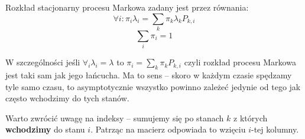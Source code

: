 \begin{theorem}[strona 228 P\&C]
    Rozkład stacjonarny procesu Markowa zadany jest przez równania:
    \[
        \forall i: \pi_i \lambda_i = \sum_k \pi_k \lambda_k P_{k, i}
    \]
    \[
        \sum_i \pi_i = 1
    \]
\end{theorem}

W szczególności jeśli \( \forall_i \lambda_i = \lambda \) to \( \pi_i = \sum_k \pi_k P_{k, i} \)
czyli rozkład procesu Markowa jest taki sam jak jego łańcucha. Ma to sens -- skoro w każdym czasie spędzamy tyle samo czasu,
to asymptotycznie wszystko powinno zależeć jedynie od tego jak często wchodzimy do tych stanów.

Warto zwrócić uwagę na indeksy -- sumujemy się po stanach \( k \) z których \textbf{wchodzimy} do stanu \( i \). Patrząc na macierz odpowiada to wzięciu \( i \)-tej kolumny.

